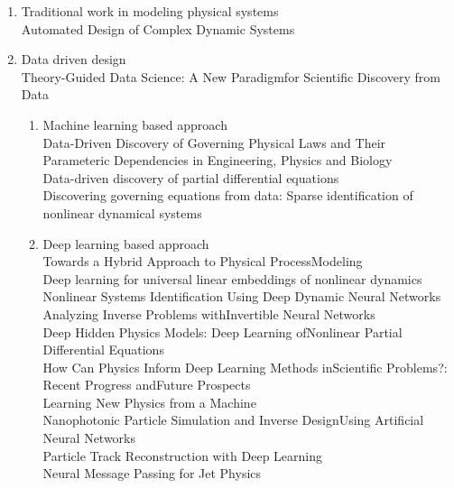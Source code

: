 \documentclass[conference]{IEEEtran}
\begin{document}
\begin{enumerate}
  \item Traditional work in modeling physical systems \\
  Automated Design of Complex Dynamic Systems \cite{hermans2014automated} \\

  \item Data driven design \\
  Theory-Guided Data Science: A New Paradigmfor Scientific Discovery from Data \cite{karpatne2017theory-guided}\\
  \begin{enumerate}
    \item Machine learning based approach \\
      Data-Driven Discovery of Governing Physical Laws and Their Parameteric Dependencies in Engineering, Physics and Biology \cite{kutz2017datadriven} \\
      Data-driven discovery of partial differential equations \cite{rudy2017datadriven} \\
      Discovering governing equations from data: Sparse identification of nonlinear dynamical systems \cite{Brunton3932} \\
    \item Deep learning based approach \\
      Towards a Hybrid Approach to Physical ProcessModeling \\
      Deep learning for universal linear embeddings of nonlinear dynamics \cite{lusch2017deep} \\
      Nonlinear Systems Identification Using Deep Dynamic Neural Networks \cite{ogunmolu2016nonlinear}\\
      Analyzing Inverse Problems withInvertible Neural Networks \cite{ardizzone2018analyzing}\\
      Deep Hidden Physics Models:  Deep Learning ofNonlinear Partial Differential Equations \cite{raissi2018deep} \\
      How Can Physics Inform Deep Learning Methods inScientific Problems?: Recent Progress andFuture Prospects \\
      Learning New Physics from a Machine \cite{d'agnolo2018learning}\\
      Nanophotonic Particle Simulation and Inverse DesignUsing Artificial Neural Networks \\
      Particle Track Reconstruction with Deep Learning \\
      Neural Message Passing for Jet Physics \\

\end{enumerate}
\end{enumerate}
\end{document}
